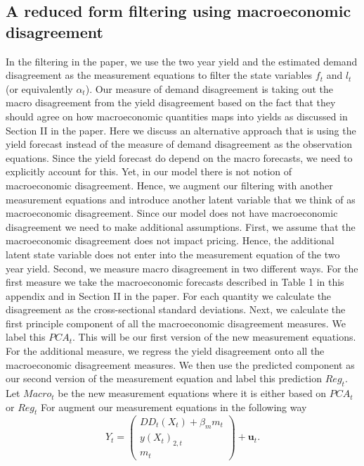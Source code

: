 \subsection{A reduced form filtering using macroeconomic disagreement}
In the filtering in the paper, we use the two year yield and the estimated demand disagreement as the measurement equations to filter the state variables $f_t$ and $l_t$ (or equivalently $\alpha_t$). Our measure of demand disagreement is taking out the macro disagreement from the yield disagreement based on the fact that they should agree on how macroeconomic quantities maps into yields as discussed in Section II in the paper. Here we discuss an alternative approach that is using the yield forecast instead of the measure of demand disagreement as the observation equations. Since the yield forecast do depend on the macro forecasts, we need to explicitly account for this. Yet, in our model there is not notion of macroeconomic disagreement. Hence, we augment our filtering with another measurement equations and introduce another latent variable that we think of as macroeconomic disagreement. Since our model does not have macroeconomic disagreement we need to make additional assumptions. First, we assume that the macroeconomic disagreement does not impact pricing. Hence, the additional latent state variable does not enter into the measurement equation of the two year yield. 
Second, we measure macro disagreement in two different ways. For the first measure we take the macroeconomic forecasts described in Table 1 in this appendix and in Section II in the paper. For each quantity we calculate the disagreement as the cross-sectional standard deviations. Next, we calculate the first principle component of all the macroeconomic disagreement measures. We label this $PCA_{t}$. This will be our first version of the new measurement equations. For the additional measure, we regress the yield disagreement onto all the macroeconomic disagreement measures. We then use the predicted component as our second version of the measurement equation and label this prediction $Reg_t$. Let $Macro_t$ be the new measurement equations where it is either based on $PCA_{t}$ or $Reg_{t}$
For augment our measurement equations in the following way
\begin{equation}
    Y_t =  \begin{pmatrix}
     DD_t\left(X_t\right) + \beta_m m_t  \\
       y\left(X_t\right)_{2,t} \\
       m_t
    \end{pmatrix}
    + \mathbf{u}_t.
\end{equation}
